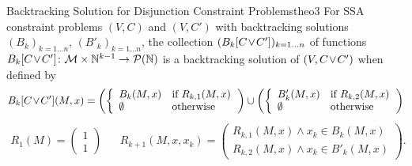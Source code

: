 \begin{theorem}{Backtracking Solution for Disjunction Constraint Problems}{theo3}
    For SSA constraint problems $(V,C)$ and $(V,C')$ with backtracking
    solutions $(B_k)_{k=1\dots n}$, $(B'_k)_{k=1\dots n}$, the collection
    $(B_k[C\hspace{-0.5mm}\lor\hspace{-0.5mm}C'])_{k=1\dots n}$ of functions
    \mbox{$B_k[C\hspace{-0.5mm}\lor\hspace{-0.5mm}C']\colon\mathcal M\times\mathbb N^{k-1}\rightarrow\mathcal P(\mathbb N)$}
    is a backtracking solution of
    $(V,C\hspace{-0.5mm}\lor\hspace{-0.5mm}C')$ when defined by
    \begin{align*}
        B_k[C\hspace{-0.5mm}\lor\hspace{-0.5mm}C'](M,x)=\left(\left\{
            \begin{array}{ll}
                B_k(M,x)&\text{if }R_{k,1}(M,x)\\
                \emptyset&\text{otherwise}
            \end{array}\right.
            \right)\cup\left(\left\{
            \begin{array}{ll}
                B'_k(M,x)&\text{if }R_{k,2}(M,x)\\
                \emptyset&\text{otherwise}
            \end{array}\right.
            \right)
    \end{align*}
    \vspace{-0.2cm}
    \begin{align*}
        R_1(M)=\left(\begin{array}{l}1\\1\end{array}\right)&&
        R_{k+1}(M,x,x_k)=\left(
            \begin{array}{l}
                R_{k,1}(M,x)\mathrel\land x_k\in B_k(M,x)\\
                R_{k,2}(M,x)\mathrel\land x_k\in B'_k(M,x)
            \end{array}\right).
    \end{align*}
    \tcblower

\end{theorem}
